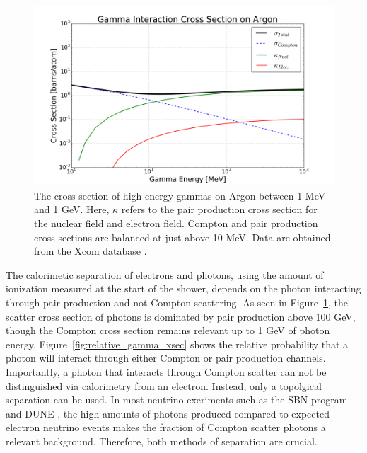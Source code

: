 \begin{figure}[ht!]
  \includegraphics[width=\textwidth]{emshower_figures/photonCrossSection.png}
  \caption[Photon Cross Section on Argon]{\label{fig:gamma_xsec} The cross section of high energy gammas on Argon between 1 MeV and 1 GeV.  Here, $\kappa$ refers to the pair production cross section for the nuclear field and electron field.  Compton and pair production cross sections are balanced at just above 10 MeV.  Data are obtained from the Xcom database \cite{Xcom}.}
\end{figure}

The calorimetic separation of electrons and photons, using the amount of ionization measured at the start of the shower, depends on the photon interacting through pair production and not Compton scattering.  As seen in Figure~\ref{fig:gamma_xsec}, the scatter cross section of photons is dominated by pair production above 100 GeV, though the Compton cross section remains relevant up to 1 GeV of photon energy.  Figure~\ref{fig:relative_gamma_xsec} shows the relative probability that a photon will interact through either Compton or pair production channels.  Importantly, a photon that interacts through Compton scatter can not be distinguished via calorimetry from an electron.  Instead, only a topolgical separation can be used.  In most neutrino exeriments such as the SBN program \cite{Antonello:2015lea} and DUNE \cite{DUNE}, the high amounts of photons produced compared to expected electron neutrino events makes the fraction of Compton scatter photons a relevant background.  Therefore, both methods of separation are crucial.

